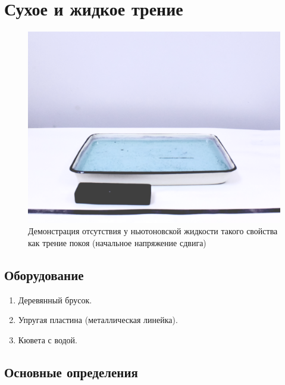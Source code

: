 \documentclass[All.tex]{subfiles}
\begin{document}

	

		\section{Сухое и жидкое трение}

	
	\begin{figure}[H] 	%
		\centering 	
		\includegraphics[width=0.75\linewidth]{friction-1.png}
		\caption{Демонстрация отсутствия у ньютоновской жидкости такого свойства как трение покоя (начальное напряжение сдвига)}
		\label{friction-1}
	\end{figure}
	
	\subsection*{\textcolor{PineGreen}{Оборудование}}
	
	\begin{enumerate} 
		\item Деревянный брусок.
		\item Упругая пластина (металлическая линейка).
		\item Кювета с водой.
		
	\end{enumerate}

	\subsection*{\textcolor{PineGreen}{Основные определения}}
	
\end{document}

